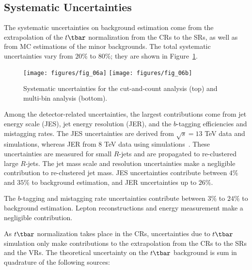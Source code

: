 \subsection{Systematic Uncertainties}\label{mb:sysun}

The systematic uncertainties on background estimation come from the
extrapolation of the $t\tbar$ normalization from the CRs to the SRs, as well as
from MC estimations of the minor backgrounds. The total systematic
uncertainties vary from $20\%$ to $80\%$; they are shown in
Figure~\ref{f:fig_06}.

\begin{figure}[H]
	\texttt{[image: figures/fig\_06a]}
	\texttt{[image: figures/fig\_06b]}
	\centering
	\caption{Systematic uncertainties for the cut-and-count analysis (top) and multi-bin
		analysis (bottom).}
	\label{f:fig_06}
\end{figure}

Among the detector-related uncertainties, the largest contributions come from
jet energy scale (JES), jet energy resolution (JER), and the $b$-tagging
efficiencies and mistagging rates. The JES uncertainties are derived from
$\sqrt{s}=13$ TeV data and simulations, whereas JER from $8$ TeV data using
simulations~\cite{ATL-PHYS-PUB-2015-015}. These uncertainties are measured for
small $R$-jets and are propagated to re-clustered large $R$-jets. The jet mass
scale and resolution uncertainties make a negligible contribution to
re-clustered jet mass. JES uncertainties contribute between $4\%$ and $35\%$ to
background estimation, and JER uncertainties up to $26\%$.

The $b$-tagging and mistagging rate uncertainties contribute between $3\%$ to
$24\%$ to background estimation. Lepton reconstructions and energy measurement
make a negligible contribution.

As $t\tbar$ normalization takes place in the CRs, uncertainties due to $t\tbar$
simulation only make contributions to the extrapolation from the CRs to the SRs
and the VRs. The theoretical uncertainty on the $t\tbar$ background is sum in
quadrature of the following sources:


